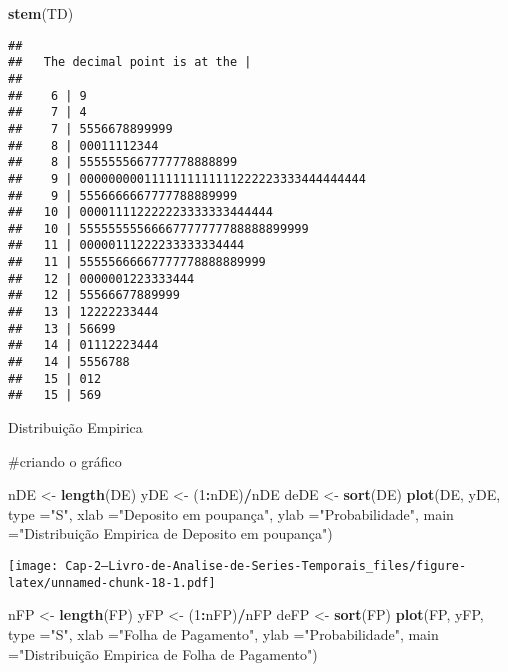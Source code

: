 \documentclass[]{article}
\newenvironment{Shaded}{\begin{snugshade}}{\end{snugshade}}
\newcommand{\DataTypeTok}[1]{\textcolor[rgb]{0.13,0.29,0.53}{#1}}
\newcommand{\DecValTok}[1]{\textcolor[rgb]{0.00,0.00,0.81}{#1}}
\newcommand{\KeywordTok}[1]{\textcolor[rgb]{0.13,0.29,0.53}{\textbf{#1}}}
\newcommand{\NormalTok}[1]{#1}
\newcommand{\OperatorTok}[1]{\textcolor[rgb]{0.81,0.36,0.00}{\textbf{#1}}}
\newcommand{\StringTok}[1]{\textcolor[rgb]{0.31,0.60,0.02}{#1}}
\begin{document}
\begin{Shaded}
\begin{Highlighting}[]
\KeywordTok{stem}\NormalTok{(TD)}
\end{Highlighting}
\end{Shaded}

\begin{verbatim}
## 
##   The decimal point is at the |
## 
##    6 | 9
##    7 | 4
##    7 | 5556678899999
##    8 | 00011112344
##    8 | 5555555667777778888899
##    9 | 0000000001111111111111222223333444444444
##    9 | 5556666667777788889999
##   10 | 000011112222223333333444444
##   10 | 55555555566667777777788888899999
##   11 | 00000111222233333334444
##   11 | 55555666667777778888889999
##   12 | 0000001223333444
##   12 | 55566677889999
##   13 | 12222233444
##   13 | 56699
##   14 | 01112223444
##   14 | 5556788
##   15 | 012
##   15 | 569
\end{verbatim}

Distribuição Empirica

\#criando o gráfico

\begin{Shaded}
\begin{Highlighting}[]
\NormalTok{nDE <-}\StringTok{ }\KeywordTok{length}\NormalTok{(DE)}
\NormalTok{yDE <-}\StringTok{ }\NormalTok{(}\DecValTok{1}\OperatorTok{:}\NormalTok{nDE)}\OperatorTok{/}\NormalTok{nDE}
\NormalTok{deDE <-}\StringTok{ }\KeywordTok{sort}\NormalTok{(DE)}
\KeywordTok{plot}\NormalTok{(DE, yDE, }\DataTypeTok{type =}\StringTok{"S"}\NormalTok{, }\DataTypeTok{xlab =}\StringTok{"Deposito em poupança"}\NormalTok{, }\DataTypeTok{ylab =}\StringTok{"Probabilidade"}\NormalTok{, }\DataTypeTok{main =}\StringTok{"Distribuição Empirica de Deposito em poupança"}\NormalTok{)}
\end{Highlighting}
\end{Shaded}

\texttt{[image: Cap-2---Livro-de-Analise-de-Series-Temporais\_files/figure-latex/unnamed-chunk-18-1.pdf]}

\begin{Shaded}
\begin{Highlighting}[]
\NormalTok{nFP <-}\StringTok{ }\KeywordTok{length}\NormalTok{(FP)}
\NormalTok{yFP <-}\StringTok{ }\NormalTok{(}\DecValTok{1}\OperatorTok{:}\NormalTok{nFP)}\OperatorTok{/}\NormalTok{nFP}
\NormalTok{deFP <-}\StringTok{ }\KeywordTok{sort}\NormalTok{(FP)}
\KeywordTok{plot}\NormalTok{(FP, yFP, }\DataTypeTok{type =}\StringTok{"S"}\NormalTok{, }\DataTypeTok{xlab =}\StringTok{"Folha de Pagamento"}\NormalTok{, }\DataTypeTok{ylab =}\StringTok{"Probabilidade"}\NormalTok{, }\DataTypeTok{main =}\StringTok{"Distribuição Empirica de Folha de Pagamento"}\NormalTok{)}
\end{Highlighting}
\end{Shaded}
\end{document}
